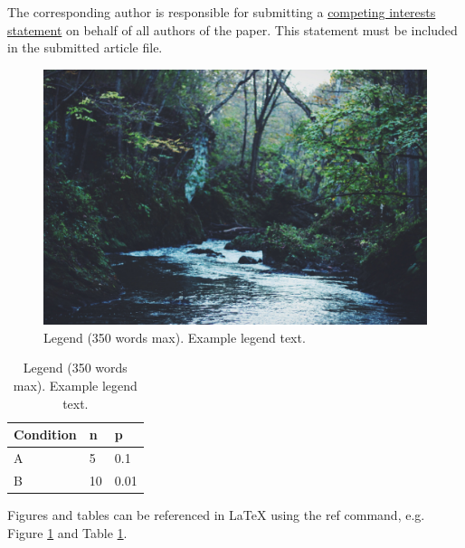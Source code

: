 \documentclass[fleqn,10pt]{wlscirep}
\begin{document}
The corresponding author is responsible for submitting a \href{http://www.nature.com/srep/policies/index.html#competing}{competing interests statement} on behalf of all authors of the paper. This statement must be included in the submitted article file.

\begin{figure}[ht]
\centering
\includegraphics[width=\linewidth]{stream}
\caption{Legend (350 words max). Example legend text.}
\label{fig:stream}
\end{figure}

\begin{table}[ht]
\centering
\begin{tabular}{|l|l|l|}
\hline
Condition & n & p \\
\hline
A & 5 & 0.1 \\
\hline
B & 10 & 0.01 \\
\hline
\end{tabular}
\caption{\label{tab:example}Legend (350 words max). Example legend text.}
\end{table}

Figures and tables can be referenced in LaTeX using the ref command, e.g. Figure \ref{fig:stream} and Table \ref{tab:example}.
\end{document}
